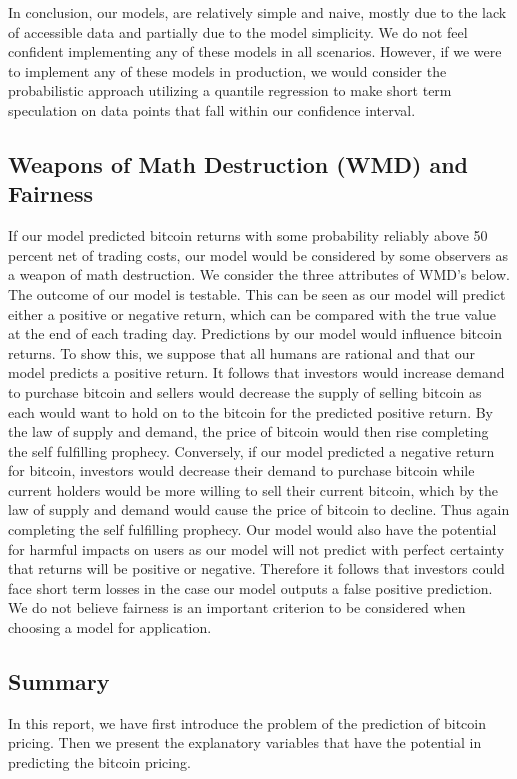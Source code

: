 \documentclass[9pt,twocolumn,twoside]{ilcss}
\begin{document}
In conclusion, our models, are relatively simple and naive, mostly due to the lack of accessible data and partially due to the model simplicity. We do not feel confident implementing any of these models in all scenarios. However, if we were to implement any of these models in production, we would consider the probabilistic approach utilizing a quantile regression to make short term speculation on data points that fall within our confidence interval.

\subsection*{Weapons of Math Destruction (WMD) and Fairness}
If our model predicted bitcoin returns with some probability reliably above 50 percent net of trading costs, our model would be considered by some observers as a weapon of math destruction.  We consider the three attributes of WMD's below.
The outcome of our model is testable. This can be seen as our model will predict either a positive or negative return, which can be compared with the true value at the end of each trading day.
Predictions by our model would influence bitcoin returns. To show this, we suppose that all humans are rational and that our model predicts a positive return. It follows that investors would increase demand to purchase bitcoin and sellers would decrease the supply of selling bitcoin as each would want to hold on to the bitcoin for the predicted positive return. By the law of supply and demand, the price of bitcoin would then rise completing the self fulfilling prophecy. Conversely, if our model predicted a negative return for bitcoin, investors would decrease their demand to purchase bitcoin while current holders would be more willing to sell their current bitcoin, which by the law of supply and demand would cause the price of bitcoin to decline. Thus again completing the self fulfilling prophecy.
Our model would also have the potential for harmful impacts on users as our model will not predict with perfect certainty that returns will be positive or negative. Therefore it follows that investors could face short term losses in the case our model outputs a false positive prediction.
We do not believe fairness is an important criterion to be considered when choosing a model for application.

\subsection*{Summary}
In this report, we have first introduce the problem of the prediction of bitcoin pricing. Then we present the explanatory variables that have the potential in predicting the bitcoin pricing.
\end{document}
